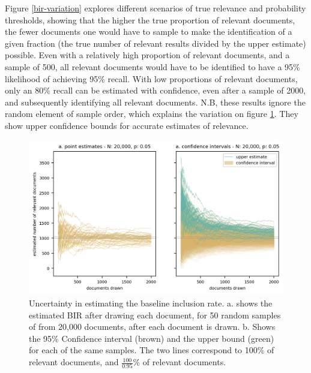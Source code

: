 \documentclass{bmcart}
\begin{document}
	Figure \ref{bir-variation} explores different scenarios of true relevance and probability thresholds, showing that the higher the true proportion of relevant documents, the fewer documents one would have to sample to make the identification of a given fraction (the true number of relevant results divided by the upper estimate) possible.  Even with a relatively high proportion of relevant documents, and a sample of 500, all relevant documents would have to be identified to have a 95\% likelihood of achieving 95\% recall. With low proportions of relevant documents, only an 80\% recall can be estimated with confidence, even after a sample of 2000, and subsequently identifying all relevant documents. N.B, these results ignore the random element of sample order, which explains the variation on figure \ref{bir-sampling}. They show upper confidence bounds for accurate estimates of relevance.

	\begin{figure}
	\includegraphics[width=\linewidth]{../images/bir_sampling.png}
	\caption{Uncertainty in estimating the baseline inclusion rate. a. shows the estimated BIR after drawing each document, for 50 random samples of from 20,000 documents, after each document is drawn. b. Shows the 95\% Confidence interval (brown) and the upper bound (green) for each of the same samples. The two lines correspond to 100\% of relevant documents, and $\frac{100}{0.95}$\% of relevant documents.}
	\label{bir-sampling}
\end{figure}
\end{document}
